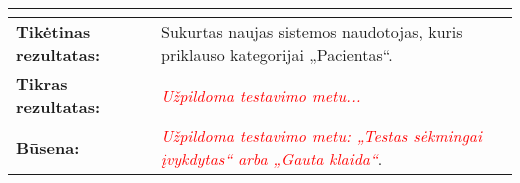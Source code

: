\documentclass[12pt]{article}
\begin{document}
\begin{table}[htb!]
\begin{tabular}{|m{6cm}|m{11cm}|}
{{        }} \\
        \hline
        \raggedleft \textbf{\cellcolor{deepchampagne}Tikėtinas rezultatas:}
        & Sukurtas naujas sistemos naudotojas, kuris priklauso kategorijai
        „Pacientas“. \\
        \hline
        \raggedleft \textbf{\cellcolor{deepchampagne}Tikras rezultatas:}
        & \textcolor{red}{\emph{Užpildoma testavimo metu...}} \\
        \hline
        \raggedleft \textbf{\cellcolor{deepchampagne}Būsena:}
        & \textcolor{red}{\emph{Užpildoma testavimo metu: „Testas sėkmingai
        įvykdytas“ arba „Gauta klaida“}}. \\
        \hline
    \end{tabular}
    \label{table:TS_1}
\end{table}

\newpage
\end{document}
